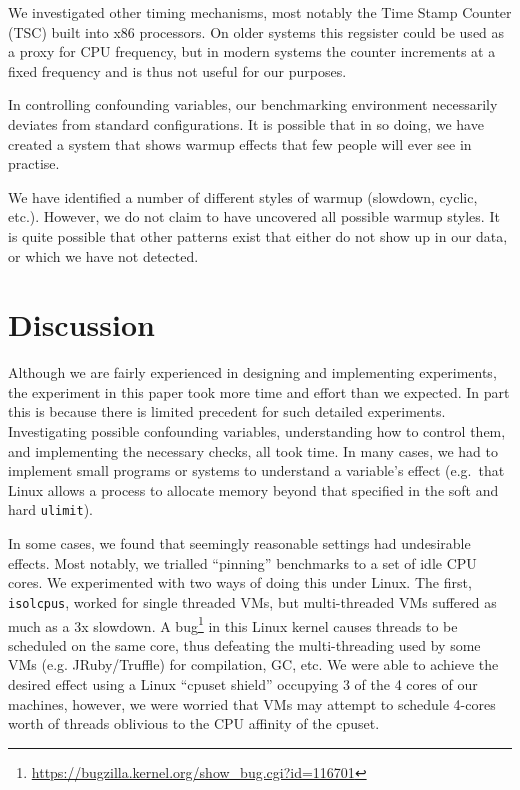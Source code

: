 \documentclass[preprint,numbers,10pt]{sigplanconf}
\begin{document}
We investigated other timing mechanisms, most notably the Time Stamp Counter
(TSC) built into x86 processors. On older systems this regsister could be used
as a proxy for CPU frequency, but in modern systems the counter increments at a
fixed frequency and is thus not useful for our purposes.

In controlling confounding variables, our benchmarking environment necessarily
deviates from standard configurations. It is possible that in so doing, we have
created a system that shows warmup effects that few people will ever see in
practise.

We have identified a number of different styles of warmup (slowdown, cyclic,
etc.). However, we do not claim to have uncovered all possible warmup styles. It
is quite possible that other patterns exist that either do not show up in our
data, or which we have not detected.


\section{Discussion}
\label{sec:Discussion}

Although we are fairly experienced in designing and implementing
experiments, the experiment in this paper took more time and effort than we
expected. In part this is because there is limited precedent for such detailed
experiments. Investigating possible confounding variables, understanding how to
control them, and implementing the necessary checks, all took time. In many
cases, we had to implement small programs or systems to understand a variable's
effect (e.g.~that Linux allows a process to allocate memory beyond that
specified in the soft and hard \texttt{ulimit}).

In some cases, we found that seemingly reasonable settings had undesirable
effects. Most notably, we trialled ``pinning'' benchmarks to a set of idle CPU
cores. We experimented with two ways of doing this under Linux. The first,
\texttt{isolcpus}, worked for single threaded VMs, but multi-threaded VMs
suffered as much as a 3x slowdown. A
bug\footnote{\url{https://bugzilla.kernel.org/show_bug.cgi?id=116701}} in this
Linux kernel causes threads to be scheduled on the same core, thus defeating
the multi-threading used by some VMs (e.g. JRuby/Truffle) for compilation, GC,
etc. We were able to achieve the desired effect using a Linux ``cpuset shield''
occupying 3 of the 4 cores of our machines, however, we were worried that VMs
may attempt to schedule 4-cores worth of threads oblivious to the CPU affinity
of the cpuset.
\end{document}
